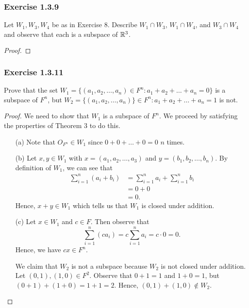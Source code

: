 \subsubsection{Exercise 1.3.9} Let \( W_{1} , W_{3} , W_{4}  \) be as in Exercise 8. Describe \( W_{1} \cap W_{3}  \), \( W_{1} \cap W_{4}  \), and \( W_{3} \cap W_{4}  \) and observe that each is a subspace of \( \mathbb{R}^{3} \).

\begin{proof}

\end{proof}


\subsubsection{Exercise 1.3.11} Prove that the set \( W_{1} = \{ (a_{1}, a_{2} , \dots , a_{n}) \in F^{n} : a_{1} + a_{2} + \dots + a_{n} = 0  \}   \) is a subspace of \( F^{n}  \), but \( W_{2} = \{ (a_{1}, a_{2}, \dots , a_{n} )  \} \in F^{n} : a_{1} + a_{2} + \dots + a_{n} = 1   \) is not.
\begin{proof}
We need to show that \( W_{1}  \) is a subspace of \( F^{n}  \). We proceed by satisfying the properties of Theorem 3 to do this. 
\begin{enumerate}
    \item[(a)] Note that \( O_{F^{n}} \in  W_{1}    \) since \( 0 + 0 + \dots + 0 = 0  \) \( n  \) times. 
    \item[(b)] Let \( x,y \in W_{1}  \) with \( x = (a_{1}, a_{2} , \dots, a_{3} )  \) and  \( y = (b_{1}, b_{2}, \dots, b_{n})   \). By definition of \( W_{1}  \), we can see that 
        \begin{align*}
            \sum_{ i=1 }^{ n } (a_{i} + b_{i}  ) &= \sum_{ i=1 }^{ n } a_{i} + \sum_{ i=1 }^{ n } b_{i}  \\
                                                 &= 0 + 0 \\
                                                 &= 0.
        \end{align*}
        Hence, \( x + y \in W_{1} \) which tells us that \( W_{1}  \) is closed under addition.
    \item[(c)] Let \( x \in W_{1}  \) and \( c \in F  \). Then observe that 
        \[ \sum_{ i=1  }^{ n } (ca_{i}) = c \sum_{ i=1 }^{ n } a_{i} = c \cdot 0 = 0.  \]
        Hence, we have \( cx \in F^{n} \).

We claim that \( W_{2}  \) is not a subspace because \( W_{2}  \) is not closed under addition. Let \( (0,1) , (1,0) \in F^{2}  \). Observe that \( 0 + 1 = 1  \) and \( 1 + 0 = 1  \), but \(  (0+1) + (1+0) =  1 + 1 = 2   \). Hence, \( (0,1) + (1,0) \notin W_{2}  \). 
\end{enumerate}

\end{proof}


